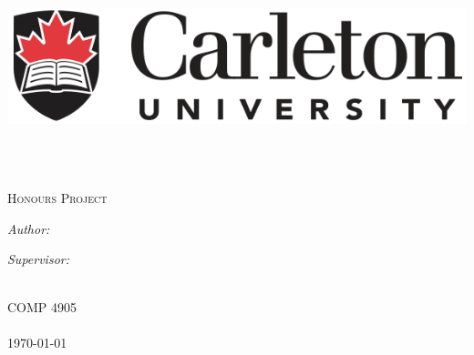 \documentclass[
	11pt, %
	oneside, %
	english, %
	singlespacing, %
	parskip, %
	headsepline, %
	chapterinoneline, %
	consistentlayout, %
]{MastersDoctoralThesis} %
\author{Matthew \textsc{Penny}} %
\begin{document}
\frontmatter %
\pagestyle{plain} %

\begin{titlepage}
	\begin{center}
		\vspace*{.06\textheight}
		{\scshape\LARGE \href{http://www.carleton.ca}{\includegraphics[scale=0.35]{Carleton-Logo}}\par}\vspace{1.5cm}
		\HRule \\[0.4cm]
		{\huge \bfseries \ttitle\par}\vspace{0.4cm}
		\HRule \\[1.5cm]
		\textsc{\Large Honours Project}\\[0.5cm]
 
		\begin{minipage}[t]{0.4\textwidth}
			\begin{flushleft} \large
				\emph{Author:}\\
				\href{http://www.mattp.ca}{\authorname}
			\end{flushleft}
		\end{minipage}
		\begin{minipage}[t]{0.4\textwidth}
			\begin{flushright} \large
				\emph{Supervisor:} \\
				\href{http://carleton.ca/scs/people/sonia-chiasson}{\supname}
			\end{flushright}
		\end{minipage}\\[3cm]
 
		\vfill
		COMP 4905\\\deptname\\[2cm]		
		\vfill
		{\large \today}\\[4cm]
		\vfill
	\end{center}
\end{titlepage}
\end{document}
